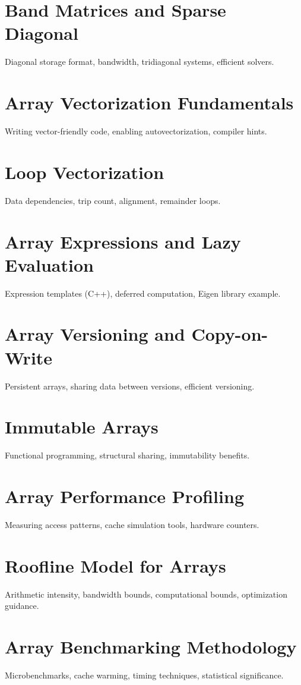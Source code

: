 \chapter{Band Matrices and Sparse Diagonal}
Diagonal storage format, bandwidth, tridiagonal systems, efficient solvers.

\chapter{Array Vectorization Fundamentals}
Writing vector-friendly code, enabling autovectorization, compiler hints.

\chapter{Loop Vectorization}
Data dependencies, trip count, alignment, remainder loops.

\chapter{Array Expressions and Lazy Evaluation}
Expression templates (C++), deferred computation, Eigen library example.

\chapter{Array Versioning and Copy-on-Write}
Persistent arrays, sharing data between versions, efficient versioning.

\chapter{Immutable Arrays}
Functional programming, structural sharing, immutability benefits.

\chapter{Array Performance Profiling}
Measuring access patterns, cache simulation tools, hardware counters.

\chapter{Roofline Model for Arrays}
Arithmetic intensity, bandwidth bounds, computational bounds, optimization guidance.

\chapter{Array Benchmarking Methodology}
Microbenchmarks, cache warming, timing techniques, statistical significance.

